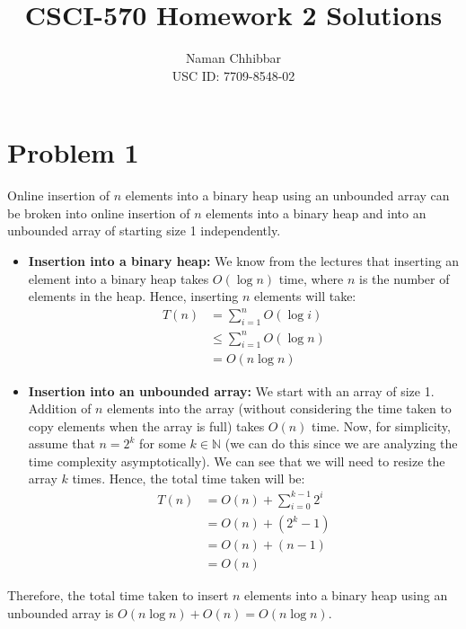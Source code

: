 \documentclass{article}
\title{CSCI-570 Homework 2 Solutions}
\author{
  Naman Chhibbar \\
  USC ID: 7709-8548-02
}
\date{}
\begin{document}
\maketitle

\section{Problem 1}
  Online insertion of $n$ elements into a binary heap using an unbounded array can be broken into online insertion of $n$ elements into a binary heap and into an unbounded array of starting size 1 independently.
  \begin{itemize}
    \item \textbf{Insertion into a binary heap:} We know from the lectures that inserting an element into a binary heap takes $O(\log n)$ time, where $n$ is the number of elements in the heap.
    Hence, inserting $n$ elements will take:
    \begin{align*}
      T(n) &= \sum_{i=1}^{n} O(\log i) \\
      &\le \sum_{i=1}^{n} O(\log n) \\
      &= O(n \log n)
    \end{align*}

    \item \textbf{Insertion into an unbounded array:} We start with an array of size 1.
    Addition of $n$ elements into the array (without considering the time taken to copy elements when the array is full) takes $O(n)$ time.
    Now, for simplicity, assume that $n = 2^k$ for some $k \in \mathbb{N}$ (we can do this since we are analyzing the time complexity asymptotically).
    We can see that we will need to resize the array $k$ times.
    Hence, the total time taken will be:
    \begin{align*}
      T(n) &= O(n) + \sum_{i=0}^{k-1} 2^i \\
      &= O(n) + (2^k - 1) \\
      &= O(n) + (n - 1) \\
      &= O(n)
    \end{align*}
  \end{itemize}
  Therefore, the total time taken to insert $n$ elements into a binary heap using an unbounded array is $O(n \log n) + O(n) = O(n \log n)$.
\end{document}
